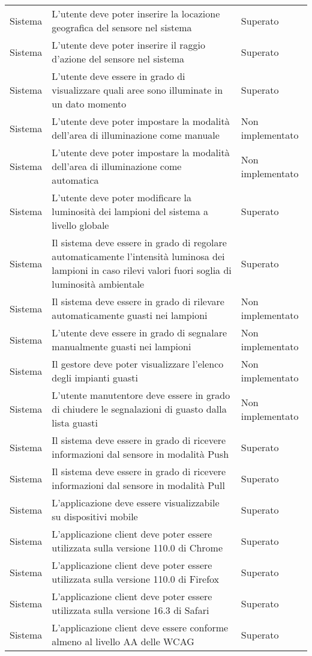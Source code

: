 \begin{center}
\begin{xltabular}{\linewidth}{|l|X|l|}
        Sistema & L'utente deve poter inserire la locazione geografica del sensore nel sistema & Superato\\
        Sistema & L'utente deve poter inserire il raggio d'azione del sensore nel sistema & Superato\\
        Sistema & L'utente deve essere in grado di visualizzare quali aree sono illuminate in un dato momento & Superato\\
        Sistema & L'utente deve poter impostare la modalità dell'area di illuminazione come manuale & Non implementato\\
        Sistema & L'utente deve poter impostare la modalità dell'area di illuminazione come automatica & Non implementato\\
        Sistema & L'utente deve poter modificare la luminosità dei lampioni del sistema a livello globale & Superato\\
        Sistema & Il sistema deve essere in grado di regolare automaticamente l'intensità luminosa dei lampioni in caso rilevi valori fuori soglia di luminosità ambientale & Superato\\
        Sistema & Il sistema deve essere in grado di rilevare automaticamente guasti nei lampioni & Non implementato\\
        Sistema & L'utente deve essere in grado di segnalare manualmente guasti nei lampioni & Non implementato\\
        Sistema & Il gestore deve poter visualizzare l'elenco degli impianti guasti & Non implementato\\
        Sistema & L'utente manutentore deve essere in grado di chiudere le segnalazioni di guasto dalla lista guasti & Non implementato\\
        Sistema & Il sistema deve essere in grado di ricevere informazioni dal sensore in modalità Push & Superato\\
        Sistema & Il sistema deve essere in grado di ricevere informazioni dal sensore in modalità Pull & Superato\\
        Sistema & L'applicazione deve essere visualizzabile su dispositivi mobile & Superato\\
        Sistema & L'applicazione client deve poter essere utilizzata sulla versione 110.0 di Chrome  & Superato\\
        Sistema & L'applicazione client deve poter essere utilizzata sulla versione 110.0 di Firefox  & Superato\\
        Sistema & L'applicazione client deve poter essere utilizzata sulla versione 16.3 di Safari  & Superato\\
        Sistema & L'applicazione client deve essere conforme almeno al livello AA delle WCAG  & Superato\\
    
        
        \hline
    \end{xltabular}
\end{center}